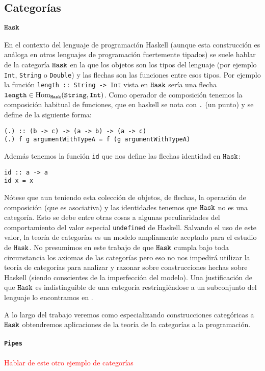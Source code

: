 \subsection{Categorías}
\paragraph{$\texttt{Hask}$}
En el contexto del lenguaje de programación Haskell (aunque esta
construcción es análoga en otros lenguajes de programación
fuertemente tipados) se suele hablar de la categoría
$\texttt{Hask}$  en la que los objetos son los tipos del lenguaje
(por ejemplo \verb~Int~, \verb~String~ o \verb~Double~) y
las flechas son las funciones entre esos tipos. Por ejemplo
la función \verb~length :: String -> Int~ vista en
$\texttt{Hask}$ sería una flecha
$\texttt{length} \in \operatorname{Hom}_{\texttt{Hask}}(\texttt{String}, \texttt{Int})$.
Como operador de composición tenemos la composición habitual de
funciones, que en haskell se nota con \texttt{.} (un punto) y se
define de la siguiente forma:
\begin{verbatim}
(.) :: (b -> c) -> (a -> b) -> (a -> c)
(.) f g argumentWithTypeA = f (g argumentWithTypeA)
\end{verbatim}
Además tenemos la función \texttt{id} que nos define las
flechas identidad en $\texttt{Hask}$:

\begin{verbatim}
id :: a -> a
id x = x
\end{verbatim}
Nótese que aun teniendo esta colección de objetos, de flechas, la
operación de composición (que es asociativa) y las identidades tenemos
que $\texttt{Hask}$ no es una categoría. Esto se debe
entre otras cosas a algunas
peculiaridades del comportamiento del
valor especial \texttt{undefined} de Haskell. Salvando el uso de
este valor, la teoría de categorías es un modelo ampliamente aceptado
para el estudio de $\texttt{Hask}$. No presumimos en este trabajo
de que $\texttt{Hask}$ cumpla bajo toda circunstancia los axiomas de las
categorías pero eso no nos impedirá utilizar la teoría de categorías
para analizar y razonar sobre construcciones hechas sobre Haskell
(siendo conscientes de la imperfección del modelo).
Una justificación de que $\texttt{Hask}$ es indistinguible de una
categoría restringiéndose a un subconjunto del lenguaje lo encontramos
en \cite{fastandloose}.

A lo largo del trabajo veremos como especializando construcciones
categóricas a $\texttt{Hask}$ obtendremos aplicaciones de la teoría
de la categorías a la programación.

\paragraph{\texttt{Pipes}}
\textcolor{red}{Hablar de este otro ejemplo de categorías}


